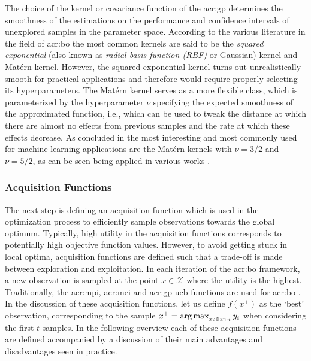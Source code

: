 The choice of the kernel or covariance function of the \acrshort{acr:gp} determines the smoothness of the estimations on the performance and confidence intervals of unexplored samples in the parameter space.
According to the various literature in the field of \acrlong{acr:bo} the most common kernels are said to be the \textit{squared exponential} (also known as \textit{radial basis function (RBF)} or Gaussian) kernel and Mat\'ern kernel.
However, the squared exponential kernel turns out unrealistically smooth for practical applications \cite{snoek2012practical} and therefore would require properly selecting its hyperparameters.
The Mat\'ern kernel serves as a more flexible class, which is parameterized by the hyperparameter $\nu$ specifying the expected smoothness of the approximated function, i.e., which can be used to tweak the distance at which there are almost no effects from previous samples and the rate at which these effects decrease. As concluded in \cite{rasmussen2006gaussian, lizotte2008practical, shahriari2016taking} the most interesting and most commonly used for machine learning applications are the Mat\'ern kernels with $\nu = 3/2$ and $\nu = 5/2$, as can be seen being applied in various works \cite{snoek2012practical, kawaguchi2015bayesian, turchetta2016safe}.  %

\subsubsection*{Acquisition Functions}
\label{sec:bayesian-optimization-acquisition}
The next step is defining an acquisition function which is used in the optimization process to efficiently sample observations towards the global optimum.
Typically, high utility in the acquisition functions corresponds to potentially high objective function values.
However, to avoid getting stuck in local optima, acquisition functions are defined such that a trade-off is made between exploration and exploitation.
In each iteration of the \acrshort{acr:bo} framework, a new observation is sampled at the point $x \in \mathcal{X}$ where the utility is the highest.
Traditionally, the \acrfull{acr:mpi}, \acrfull{acr:mei} and \acrfull{acr:gp-ucb} functions are used for \acrlong{acr:bo} \cite{shahriari2016taking}.
In the discussion of these acquisition functions, let us define $f(x^+)$ as the `best' observation, corresponding to the sample $x^+ = \operatorname*{arg\,max}_{x_i \in x_{1:t}} y_i$ when considering the first $t$ samples.
In the following overview each of these acquisition functions are defined accompanied by a discussion of their main advantages and disadvantages seen in practice.

